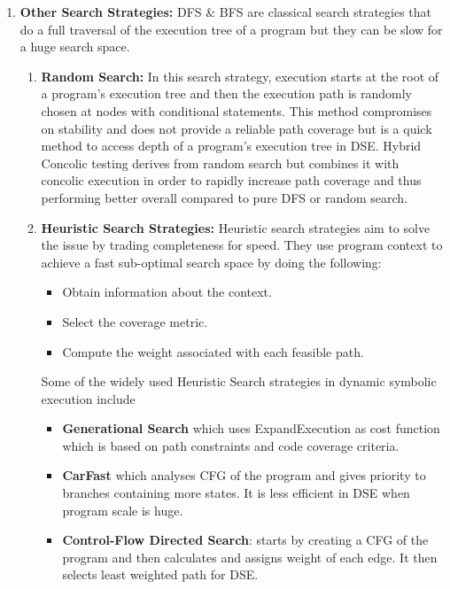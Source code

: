 \documentclass[11pt]{llncs}
\begin{document}
\begin{enumerate}
			\item \textbf{Other Search Strategies:}
	        DFS \& BFS are classical search strategies that do a full traversal of the execution tree of a program but they can be slow for a huge search space.
	        		\vspace{2mm}
			\begin{enumerate}
			    \item \textbf{Random Search:}
			    In this search strategy, execution starts at the root of a program's execution tree and then the execution path is randomly chosen at nodes with conditional statements. This method compromises on stability and does not provide a reliable path coverage but is a quick method to access depth of a program's execution tree in DSE. Hybrid Concolic testing \cite{15_Random} derives from random search but combines it with concolic execution in order to rapidly increase path coverage and thus performing better overall compared to pure DFS or random search.
			   \vspace{3mm}
			    \item \textbf{Heuristic Search Strategies:}
				 Heuristic search strategies aim to solve the issue by trading completeness for speed. They use program context to achieve a fast sub-optimal search space by doing the following: \cite{1_Search_Strategies_DSE}
				\begin{itemize}
					\item Obtain information about the context.
					\item Select the coverage metric.
					\item Compute the weight associated with each feasible path.
				\end{itemize}
                		   \vspace{2mm}
			    Some of the widely used Heuristic Search strategies in dynamic symbolic execution include
				\begin{itemize}
					\item \textbf{Generational Search} which uses ExpandExecution as cost function which is based on path constraints and code coverage criteria.
					\item \textbf{CarFast} which analyses CFG of the program and gives priority to branches containing more states. It is less efficient in DSE when program scale is huge.
					\item \textbf{Control-Flow Directed Search}: starts by creating a CFG of the program and then calculates and assigns weight of each edge. It then selects least weighted path for DSE.

\end{itemize}
\end{enumerate}
\end{enumerate}
\end{document}

